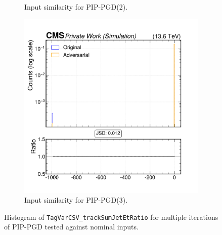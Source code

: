 \begin{figure}[htbp]
\begin{subfigure}[t]{0.32\textwidth}
    \caption*{Input similarity for PIP-PGD(2).}
  \end{subfigure}\hfill
  \begin{subfigure}[t]{0.32\textwidth}
    \includegraphics[width=\linewidth]{media/output/features/compare/combined_it_3/cmp_global_features_TagVarCSV_trackSumJetEtRatio.pdf}
    \caption*{Input similarity for PIP-PGD(3).}
  \end{subfigure}

  \caption*{Histogram of \texttt{TagVarCSV\_trackSumJetEtRatio} for multiple iterations of PIP-PGD tested against nominal inputs.}
  \label{fig:combined_input_TagVarCSV_trackSumJetEtRatio}
\end{figure}

